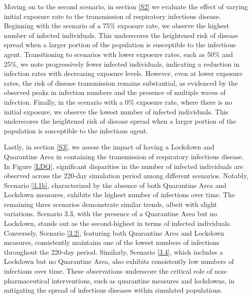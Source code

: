 Moving on to the second scenario, in section \ref{S2} we evaluate the effect of varying initial exposure rate to the transmission of respiratory infectious disease. Beginning with the scenario of a 75\% exposure rate,  we observe the highest number of infected individuals. This underscores the heightened risk of disease spread when a larger portion of the population is susceptible to the infectious agent. Transitioning to scenarios with lower exposure rates, such as 50\% and 25\%, we note progressively fewer infected individuals, indicating a reduction in infection rates with decreasing exposure levels. However, even at lower exposure rates, the risk of disease transmission remains substantial, as evidenced by the observed peaks in infection numbers and the presence of multiple waves of infection. Finally, in the scenario with a 0\% exposure rate, where there is no initial exposure, we observe the lowest number of infected individuals. This underscores the heightened risk of disease spread when a larger portion of the population is susceptible to the infectious agent.

Lastly, in section \ref{S3}, we assess the impact of having a Lockdown and Quarantine Area in containing the transmission of respiratory infectious disease. In Figure \ref{LDQ}, significant disparities in the number of infected individuals are observed across the 220-day simulation period among different scenarios. Notably, Scenario \ref{3.1b}, characterized by the absence of both Quarantine Area and Lockdown measures, exhibits the highest number of infections over time. The remaining three scenarios demonstrate similar trends, albeit with slight variations. Scenario 3.3, with the presence of a Quarantine Area but no Lockdown, stands out as the second-highest in terms of infected individuals. Conversely, Scenario \ref{3.2}, featuring both Quarantine Area and Lockdown measures, consistently maintains one of the lowest numbers of infections throughout the 220-day period. Similarly, Scenario \ref{3.4}, which includes a Lockdown but no Quarantine Area, also exhibits consistently low numbers of infections over time. These observations underscore the critical role of non-pharmaceutical interventions, such as quarantine measures and lockdowns, in mitigating the spread of infectious diseases within simulated populations. 

